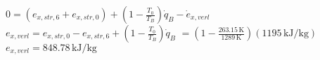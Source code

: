 \( 0 = (e_{x,str,6} + e_{x,str,0}) + (1 - \frac{T_0}{T_B})\dot{q}_B - \dot{e}_{x,verl} \)  
\( e_{x,verl} = e_{x,str,0} - e_{x,str,6} + (1 - \frac{T_0}{T_B})\dot{q}_B \)  
\( = (1 - \frac{263.15 \, \text{K}}{1289 \, \text{K}})(1195 \, \text{kJ/kg}) \)  
\( e_{x,verl} = 848.78 \, \text{kJ/kg} \)